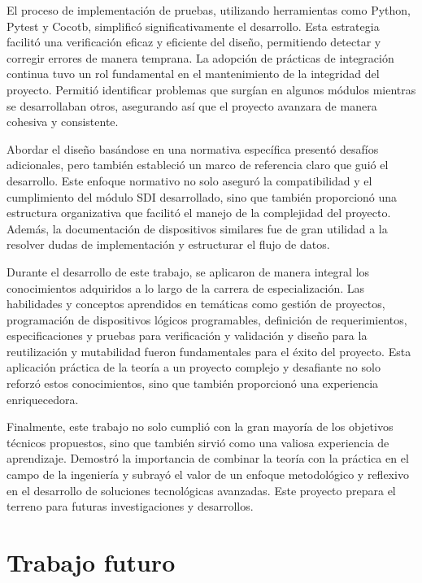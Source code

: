 El proceso de implementación de pruebas, utilizando herramientas como Python,
Pytest y Cocotb, simplificó significativamente el desarrollo. Esta estrategia
facilitó una verificación eficaz y eficiente del diseño, permitiendo detectar
y corregir errores de manera temprana. La adopción de prácticas de integración
continua tuvo un rol fundamental en el mantenimiento de la integridad del
proyecto. Permitió identificar problemas que surgían en algunos módulos mientras
se desarrollaban otros, asegurando así que el proyecto avanzara de manera
cohesiva y consistente.

Abordar el diseño basándose en una normativa específica presentó desafíos
adicionales, pero también estableció un marco de referencia claro que guió el
desarrollo. Este enfoque normativo no solo aseguró la compatibilidad y el
cumplimiento del módulo SDI desarrollado, sino que también proporcionó una
estructura organizativa que facilitó el manejo de la complejidad del proyecto.
Además, la documentación de dispositivos similares fue de gran utilidad a la
resolver dudas de implementación y estructurar el flujo de datos.

Durante el desarrollo de este trabajo, se aplicaron de manera integral los
conocimientos adquiridos a lo largo de la carrera de especialización. Las
habilidades y conceptos aprendidos en temáticas como gestión de proyectos,
programación de dispositivos lógicos programables, definición de
requerimientos, especificaciones y pruebas para verificación y validación y
diseño para la reutilización y mutabilidad fueron fundamentales para el éxito
del proyecto. Esta aplicación práctica de la teoría a un proyecto complejo y
desafiante no solo reforzó estos conocimientos, sino que también proporcionó
una experiencia enriquecedora.

Finalmente, este trabajo no solo cumplió con la gran mayoría de los objetivos
técnicos propuestos, sino que también sirvió como una valiosa experiencia de
aprendizaje. Demostró la importancia de combinar la teoría con la práctica en
el campo de la ingeniería y subrayó el valor de un enfoque metodológico y
reflexivo en el desarrollo de soluciones tecnológicas avanzadas. Este proyecto
prepara el terreno para futuras investigaciones y desarrollos.

\section{Trabajo futuro}


